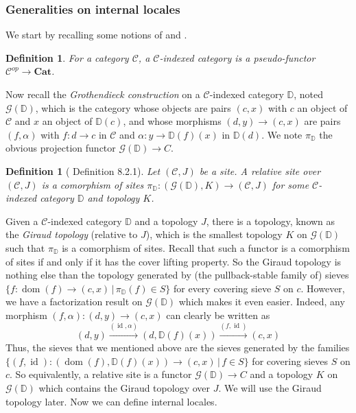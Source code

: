 \documentclass{article}
\newtheorem{definition}[theorem]{Definition}
\newcommand{\dom}{{\operatorname{dom}}}
\newcommand{\id}{\operatorname{id}}
\newcommand{\Cat}{\mathbf{Cat}}
\newcommand{\dcat}{\mathbb{D}}
\begin{document}
\subsubsection{Generalities on internal locales}\label{sec:int_loc}
We start by recalling some notions of \cite{caramello2021relative} and \cite{caramello2022fibred}. 
\begin{definition}
    For a category $\mathcal{C}$, a $\mathcal{C}$-indexed category is a pseudo-functor $\mathcal{C}^{op}\xrightarrow{}\Cat$.
\end{definition}
Now recall the \emph{Grothendieck construction} on a $\mathcal{C}$-indexed category $\dcat$, noted $\mathcal{G}(\dcat)$, which is the category whose objects are pairs $(c,x)$ with $c$ an object of $\mathcal{C}$ and $x$ an object of $\dcat(c)$, and whose morphisms $(d,y)\xrightarrow{}(c,x)$ are pairs $(f,\alpha)$ with $f:d\xrightarrow{}c$ in $\mathcal{C}$ and $\alpha:y\xrightarrow{}\dcat(f)(x)$ in $\dcat(d)$. We note $\pi_\dcat$ the obvious projection functor $\mathcal{G}(\dcat)\xrightarrow{}C$. 
\begin{definition}[\cite{caramello2021relative} Definition 8.2.1]
    Let $(\mathcal{C},J)$ be a site. A relative site over $(\mathcal{C},J)$ is a comorphism of sites $\pi_\dcat:(\mathcal{G}(\dcat),K)\xrightarrow{}(\mathcal{C},J)$ for some $\mathcal{C}$-indexed category $\dcat$ and topology $K$. 
\end{definition}
Given a $\mathcal{C}$-indexed category $\dcat$ and a topology $J$, there is a topology, known as the \emph{Giraud topology} (relative to $J$), which is the smallest topology $K$ on $\mathcal{G}(\dcat)$ such that $\pi_\dcat$ is a comorphism of sites. Recall that such a functor is a comorphism of sites if and only if it has the cover lifting property. So the Giraud topology is nothing else than the topology generated by (the pullback-stable family of) sieves $\{f:\dom(f)\xrightarrow{}(c,x)\,|\,\pi_\dcat(f)\in S\}$ for every covering sieve $S$ on $c$. However, we have a factorization result on $\mathcal{G}(\dcat)$ which makes it even easier. Indeed, any morphism $(f,\alpha):(d,y)\xrightarrow{}(c,x)$ can clearly be written as $$(d,y)\xrightarrow{(\id,\alpha)}(d,\dcat(f)(x))\xrightarrow{(f,\id)}(c,x)$$
Thus, the sieves that we mentioned above are the sieves generated by the families $\{(f,\id):(\dom(f),\dcat(f)(x))\xrightarrow{}(c,x)\,|\,f\in S\}$ for covering sieves $S$ on $c$. So equivalently, a relative site is a functor $\mathcal{G}(\dcat)\xrightarrow{}C$ and a topology $K$ on $\mathcal{G}(\dcat)$ which contains the Giraud topology over $J$. We will use the Giraud topology later. Now we can define internal locales. 
\end{document}
